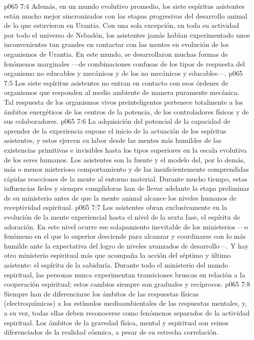 \vs p065 7:4 Además, en un mundo evolutivo promedio, los siete espíritus asistentes están mucho mejor sincronizados con las etapas progresivas del desarrollo animal de lo que estuvieron en Urantia. Con una sola excepción, en toda su actividad por todo el universo de Nebadón, los asistentes jamás habían experimentado unos inconvenientes tan grandes en contactar con las mentes en evolución de los organismos de Urantia. En este mundo, se desarrollaron muchas formas de fenómenos marginales ---de combinaciones confusas de los tipos de respuesta del organismo no educables y mecánicos y de los no mecánicos y educables---.
\vs p065 7:5 Los siete espíritus asistentes no entran en contacto con esos órdenes de organismos que responden al medio ambiente de manera puramente mecánica. Tal respuesta de los organismos vivos preinteligentes pertenece totalmente a los ámbitos energéticos de los centros de la potencia, de los controladores físicos y de sus colaboradores.
\vs p065 7:6 La adquisición del potencial de la capacidad de aprender de la experiencia supone el inicio de la actuación de los espíritus asistentes, y estos ejercen su labor desde las mentes más humildes de las existencias primitivas e invisibles hasta los tipos superiores en la escala evolutiva de los seres humanos. Los asistentes son la fuente y el modelo del, por lo demás, más o menos misterioso comportamiento y de las insuficientemente comprendidas rápidas reacciones de la mente al entorno material. Durante mucho tiempo, estas influencias fieles y siempre cumplidoras han de llevar adelante la etapa preliminar de su ministerio antes de que la mente animal alcance los niveles humanos de receptividad espiritual.
\vs p065 7:7 Los asistentes obran exclusivamente en la evolución de la mente experiencial hasta el nivel de la sexta fase, el espíritu de adoración. En este nivel ocurre ese solapamiento inevitable de los ministerios ---o fenómeno en el que lo superior desciende para alcanzar y coordinarse con lo más humilde ante la expectativa del logro de niveles avanzados de desarrollo---. Y hay otro ministerio espiritual más que acompaña la acción del séptimo y último asistente: el espíritu de la sabiduría. Durante todo el ministerio del mundo espiritual, las personas nunca experimentan transiciones bruscas en relación a la cooperación espiritual; estos cambios siempre son graduales y recíprocos.
\vs p065 7:8 Siempre han de diferenciarse los ámbitos de las respuestas físicas (electroquímicas) a los estímulos medioambientales de las respuestas mentales, y, a su vez, todas ellas deben reconocerse como fenómenos separados de la actividad espiritual. Los ámbitos de la gravedad física, mental y espiritual son reinos diferenciados de la realidad cósmica, a pesar de su estrecha correlación.
